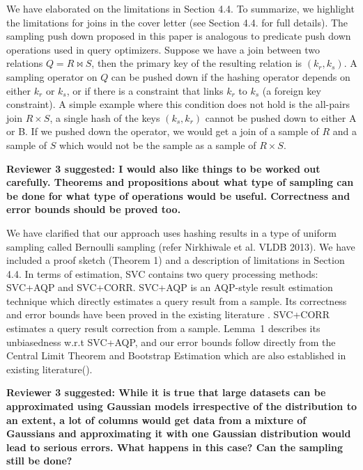 We have elaborated on the limitations in Section 4.4.
To summarize, we highlight the limitations for joins in the cover letter (see Section 4.4. for full details).
The sampling push down proposed in this paper is analogous to predicate push down operations used in query optimizers. 
Suppose we have a join between two relations $Q = R \bowtie S$, then the primary key of the resulting relation is $(k_r, k_s)$.
A sampling operator on $Q$ can be pushed down if the hashing operator depends on either $k_r$ or $k_s$, or if there is a constraint that links $k_r$ to $k_s$ (a foreign key constraint).
A simple example where this condition does not hold is the all-pairs join $R \times S$, a single hash of the keys $(k_s, k_r)$ cannot be pushed down to either A or B. 
If we pushed down the operator, we would get a join of a sample of $R$ and a sample of $S$ which would not be the sample as a sample of $R \times S$.

\vspace{1.5em}

\textbf{Reviewer 3 suggested: I would also like things to be worked out carefully. Theorems and propositions about what type of sampling can be done for what type of operations would be useful. Correctness and error bounds should be proved too.}

We have clarified that our approach uses hashing results in a type of uniform sampling called Bernoulli sampling (refer Nirkhiwale et al. VLDB 2013). We have included a proof sketch (Theorem 1) and a description of limitations in Section 4.4. In terms of estimation, SVC contains two query processing methods:  SVC+AQP and SVC+CORR. SVC+AQP is an AQP-style result estimation technique which directly estimates a query result from a sample. Its correctness and error bounds have been proved in the existing literature \cite{AgarwalMPMMS13,agarwalknowing}. SVC+CORR estimates a query result correction from a sample. Lemma~1 describes its unbiasedness w.r.t SVC+AQP, and our error bounds follow directly from the Central Limit Theorem and Bootstrap Estimation which are also established in existing literature(\cite{agarwalknowing}).

\vspace{1.5em}

\textbf{Reviewer 3 suggested: While it is true that large datasets can be approximated using Gaussian models irrespective of the distribution to an extent, a lot of columns would get data from a mixture of Gaussians and approximating it with one Gaussian distribution would lead to serious errors. What happens in this case? Can the sampling still be done?}

